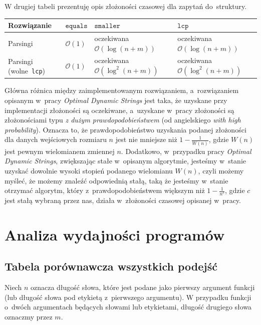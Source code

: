 \documentclass[declaration,shortabstract]{iithesis}
\theoremstyle{definition} \newtheorem{definition}{Definicja}[chapter]
\theoremstyle{remark} \newtheorem{remark}[definition]{Obserwacja}
\theoremstyle{plain} \newtheorem{theorem}[definition]{Twierdzenie}
\theoremstyle{remark} \newtheorem{example}{Przykład}[definition]
\theoremstyle{plain} \newtheorem{lemma}[definition]{Lemat}
\begin{document}
W drugiej tabeli prezentuję opis złożoności czasowej dla zapytań do~struktury.

\begin{center}
    \begin{tabular}{ | m{3cm} | >{\centering\arraybackslash}m{3cm} | >{\centering\arraybackslash}m{3cm} | >{\centering\arraybackslash}m{3cm} | }
        \hline 
        Rozwiązanie & $\texttt{equals}$ & $\texttt{smaller}$ & $\texttt{lcp}$ \\
        \hline
        Parsingi & $\mathcal{O}(1)$ & oczekiwana $\mathcal{O}(\log(n + m))$ & oczekiwana $\mathcal{O}(\log(n + m))$ \\
        \hline
        Parsingi (wolne~\texttt{lcp}) & $\mathcal{O}(1)$ & oczekiwana $\mathcal{O}(\log^2(n + m))$ & oczekiwana $\mathcal{O}(\log^2(n + m))$ \\
        \hline
    \end{tabular}
\end{center}

Główna różnica między zaimplementowanym rozwiązaniem, a~rozwiązaniem opisanym w~pracy \textit{Optimal Dynamic Strings} jest taka, że uzyskane przy implementacji złożoności są oczekiwane, a~uzyskane w~pracy złożoności są złożonościami typu \textit{z dużym prawdopodobieństwem} (od angielskiego \textit{with high probability}). Oznacza to, że prawdopodobieństwo uzyskania podanej złożoności dla danych wejściowych rozmiaru $n$ jest nie mniejsze niż $1 - \frac{1}{W(n)}$, gdzie $W(n)$ jest pewnym wielomianem zmiennej $n$. Dodatkowo, w~przypadku pracy \textit{Optimal Dynamic Strings}, zwiększając stałe w~opisanym algorytmie, jesteśmy w~stanie uzyskać dowolnie wysoki stopień podanego wielomianu $W(n)$, czyli możemy myśleć, że możemy znaleźć odpowiednią stałą, taką że jesteśmy w~stanie otrzymać algorytm, który z~prawdopodobieństwem większym niż $1 - \frac{1}{n^c}$, gdzie $c$ jest stałą wybraną przez nas, działa w~złożoności czasowej opisanej w~pracy.

\chapter{Analiza wydajności programów}

\section{Tabela porównawcza wszystkich podejść}

Niech $n$ oznacza długość słowa, które jest podane jako pierwszy argument funkcji (lub długość słowa pod etykietą z~pierwszego argumentu). W przypadku funkcji o~dwóch argumentach będących słowami lub etykietami, długość drugiego słowa oznaczmy przez $m$.
\end{document}
